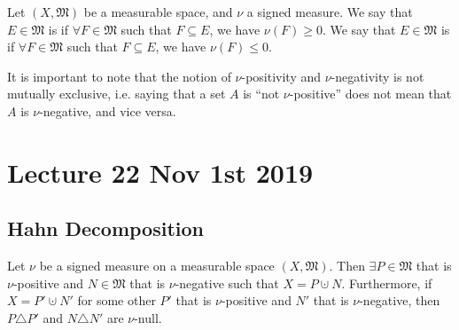 \documentclass[notoc,notitlepage]{tufte-book}
\begin{document}
\begin{defn}\label{defn:_nu_positive_and_nu_negative}
  Let $(X, \mathfrak{M})$ be a measurable space,
  and $\nu$ a signed measure.
  We say that $E \in \mathfrak{M}$ is 
  if $\forall F \in \mathfrak{M}$ such that $F \subseteq E$,
  we have $\nu(F) \geq 0$.
  We say that $E \in \mathfrak{M}$ is 
  if $\forall F \in \mathfrak{M}$ such that $F \subseteq E$,
  we have $\nu(F) \leq 0$.
\end{defn}

\begin{remark}
  It is important to note that the notion of $\nu$-positivity
  and $\nu$-negativity is not mutually exclusive, i.e.
  saying that a set $A$ is ``not $\nu$-positive''
  does not mean that $A$ is $\nu$-negative, and vice versa.
\end{remark}



\chapter{Lecture 22 Nov 1st 2019}%
\label{chp:lecture_22_nov_1st_2019}

\section{Hahn Decomposition}%
\label{sec:hahn_decomposition}

\begin{thm}\label{thm:hahn_decomposition_theorem}
  Let $\nu$ be a signed measure on a measurable space $(X, \mathfrak{M})$.
  Then $\exists P \in \mathfrak{M}$ that is $\nu$-positive
  and $N \in \mathfrak{M}$ that is $\nu$-negative such that
  $X = P \cupdot N$.
  Furthermore, if $X = P' \cupdot N'$ for some other
  $P'$ that is $\nu$-positive and $N'$ that is $\nu$-negative,
  then $P \triangle P'$ and $N \triangle N'$ are $\nu$-null.
\end{thm}

\end{document}
